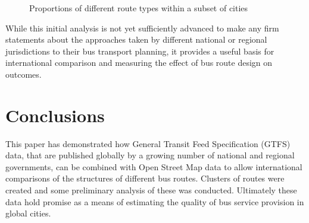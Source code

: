 \documentclass[11pt]{article}
\begin{document}
\begin{figure}[h] \begin{center} 
 \caption{Proportions of different route types within a subset of cities} \label{fig:barh} \end{center} \end{figure} %

While this initial analysis is not yet sufficiently advanced to make any firm statements about the approaches taken by different national or regional jurisdictions to their bus transport planning, it provides a useful basis for international comparison and measuring the effect of bus route design on outcomes.


\section{Conclusions} \label{conclusion}

This paper has demonstrated how General Transit Feed Specification (GTFS) data, that are published globally by a growing number of national and regional governments, can be combined with Open Street Map data to allow international comparisons of the structures of different bus routes. Clusters of routes were created and some preliminary analysis of these was conducted. Ultimately these data hold promise as a means of estimating the quality of bus service provision in global cities.
\end{document}
